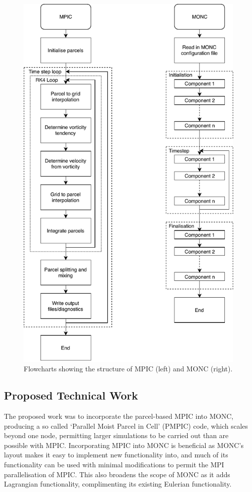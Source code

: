 \documentclass{article}
\begin{document}
\begin{figure}
  \begin{center}
    \includegraphics[scale=0.9]{pmpic_images/flowchart.pdf}
  \end{center}
  \caption{Flowcharts showing the structure of MPIC (left) and MONC (right).}
  \label{flowchart}
\end{figure}

\subsection{Proposed Technical Work}
The proposed work was to incorporate the parcel-based MPIC into MONC, producing a so called `Parallel Moist Parcel in Cell' (PMPIC) code, which scales beyond one node, permitting larger simulations to be carried out than are possible with MPIC. Incorporating MPIC into MONC is beneficial as MONC's layout makes it easy to implement new functionality into, and much of its functionality can be used with minimal modifications to permit the MPI parallelisation of MPIC.
This also broadens the scope of MONC as it adds Lagrangian functionality, complimenting its existing Eulerian functionality.
\end{document}
